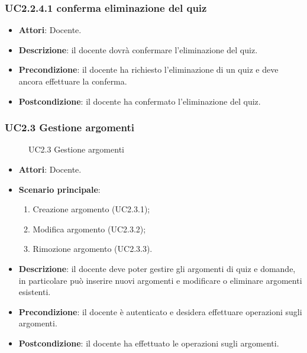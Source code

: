 \subsubsection{UC2.2.4.1 conferma eliminazione del quiz}
\begin{itemize}
\item \textbf{Attori}: Docente.
\item \textbf{Descrizione}: il docente dovrà confermare l'eliminazione del quiz.
\item \textbf{Precondizione}: il docente ha richiesto l'eliminazione di un quiz e deve ancora effettuare la conferma.
\item \textbf{Postcondizione}: il docente ha confermato l'eliminazione del quiz.
\end{itemize}
\subsubsection{UC2.3 Gestione argomenti}
\begin{figure}[H]
\centering
\noindent{}
\caption{UC2.3 Gestione argomenti}
\end{figure}
\begin{itemize}
\item \textbf{Attori}: Docente.
\item \textbf{Scenario principale}:
\begin{enumerate}
\item Creazione argomento (UC2.3.1);
\item Modifica argomento (UC2.3.2);
\item Rimozione argomento (UC2.3.3).
\end{enumerate}
\item \textbf{Descrizione}: il docente deve poter gestire gli argomenti di quiz e domande, in particolare può inserire nuovi argomenti e modificare o eliminare argomenti esistenti.
\item \textbf{Precondizione}: il docente è autenticato e desidera effettuare operazioni sugli argomenti.
\item \textbf{Postcondizione}: il docente ha effettuato le operazioni sugli argomenti.
\end{itemize}
